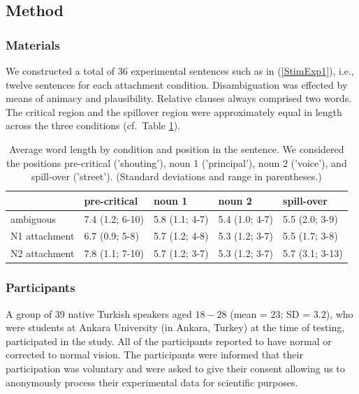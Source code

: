 \documentclass[english, doc]{apa7}\usepackage[]{graphicx}\usepackage[]{color}
\begin{document}
\subsection{Method}

\subsubsection{Materials}

We constructed a total of 36 experimental sentences such as in (\ref{StimExp1}), i.e., twelve sentences for each attachment condition. Disambiguation was effected by means of animacy and plausibility. Relative clauses always comprised two words. The critical region and the spillover region were approximately equal in length across the three conditions (cf.~Table \ref{tab:r eyeStimuliStats}).





\begin{table}
\caption{\label{tab:r eyeStimuliStats}Average word length by condition and position in the sentence. We considered the positions pre-critical ('shouting'), noun 1 ('principal'), noun 2 ('voice'), and spill-over ('street'). (Standard deviations and range in parentheses.)}
\centering
\begin{tabular}[t]{l|l|l|l|l}
\hline
  & pre-critical & noun 1 & noun 2 & spill-over\\
\hline
ambiguous & 7.4 (1.2; 6-10) & 5.8 (1.1; 4-7) & 5.4 (1.0; 4-7) & 5.5 (2.0; 3-9)\\
\hline
N1 attachment & 6.7 (0.9; 5-8) & 5.7 (1.2; 4-8) & 5.3 (1.2; 3-7) & 5.5 (1.7; 3-8)\\
\hline
N2 attachment & 7.8 (1.1; 7-10) & 5.7 (1.2; 3-7) & 5.3 (1.2; 3-7) & 5.7 (3.1; 3-13)\\
\hline
\end{tabular}
\end{table}


\subsubsection{Participants}

A group of 39 native Turkish speakers aged $18-28$ (mean = $23$; SD = $3.2$), who were students at Ankara University (in Ankara, Turkey) at the time of testing, participated in the study. 
All of the participants reported to have normal or corrected to normal vision.
The participants were informed that their participation was voluntary and were asked to give their consent allowing us to anonymously process their experimental data for scientific purposes.
\end{document}
